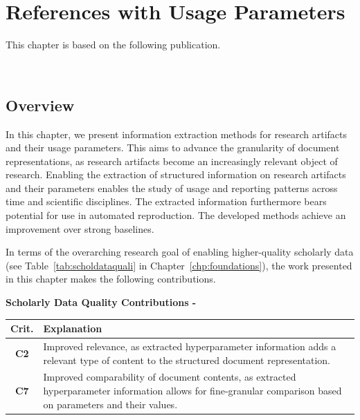 \chapter{References with Usage Parameters}
\label{chp:params}

This chapter is based on the following publication.
\begin{infobox-pub}
\\
\end{infobox-pub}

\section{Overview}
In this chapter, we present information extraction methods for research artifacts and their usage parameters. This aims to advance the granularity of document representations, as research artifacts become an increasingly relevant object of research. Enabling the extraction of structured information on research artifacts and their parameters enables the study of usage and reporting patterns across time and scientific disciplines. The extracted information furthermore bears potential for use in automated reproduction. The developed methods achieve an improvement over strong baselines.

In terms of the overarching research goal of enabling higher-quality scholarly data (see Table~\ref{tab:scholdataquali} in Chapter~\ref{chp:foundations}), the work presented in this chapter makes the following contributions.

\begin{infobox-progress}
      \textbf{Scholarly Data Quality Contributions - \cite{Saier2023hyperpie}}

      \begin{tabular}{cp{11.3cm}}
        \toprule
        Crit. & Explanation \\
        \midrule
        \textbf{C2} & Improved relevance, as extracted hyperparameter information adds a relevant type of content to the structured document representation. \\
        \textbf{C7} & Improved comparability of document contents, as extracted hyperparameter information allows for fine-granular comparison based on parameters and their values. \\
        \bottomrule
      \end{tabular}
\end{infobox-progress}

